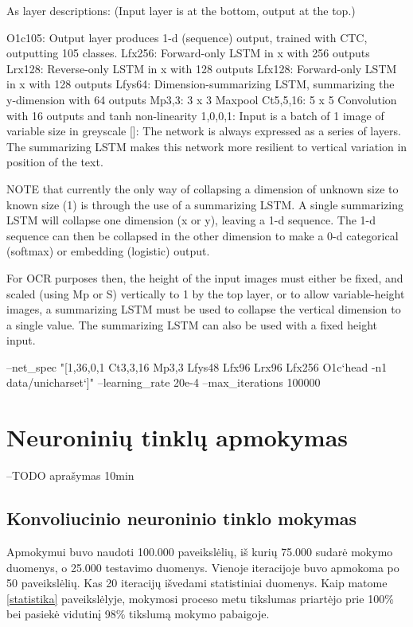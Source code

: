 \documentclass{VUMIFInfBakalaurinis}
\begin{document}
As layer descriptions: (Input layer is at the bottom, output at the top.)

O1c105: Output layer produces 1-d (sequence) output, trained with CTC,
  outputting 105 classes.
Lfx256: Forward-only LSTM in x with 256 outputs
Lrx128: Reverse-only LSTM in x with 128 outputs
Lfx128: Forward-only LSTM in x with 128 outputs
Lfys64: Dimension-summarizing LSTM, summarizing the y-dimension with 64 outputs
Mp3,3: 3 x 3 Maxpool
Ct5,5,16: 5 x 5 Convolution with 16 outputs and tanh non-linearity
1,0,0,1: Input is a batch of 1 image of variable size in greyscale
[]: The network is always expressed as a series of layers.
The summarizing LSTM makes this network more resilient to vertical variation in position of the text.


NOTE that currently the only way of collapsing a dimension of unknown size to known size (1) is through the use of a summarizing LSTM. 
A single summarizing LSTM will collapse one dimension (x or y), leaving a 1-d sequence. The 1-d sequence can then be collapsed in the 
other dimension to make a 0-d categorical (softmax) or embedding (logistic) output.

For OCR purposes then, the height of the input images must either be fixed, and scaled (using Mp or S) vertically to 1 by the top layer, 
or to allow variable-height images, a summarizing LSTM must be used to collapse the vertical dimension to a single value. 
The summarizing LSTM can also be used with a fixed height input.

--net_spec "[1,36,0,1 Ct3,3,16 Mp3,3 Lfys48 Lfx96 Lrx96 Lfx256 O1c`head -n1 data/unicharset`]" 
--learning_rate 20e-4 
--max_iterations 100000

\pagebreak
\section{Neuroninių tinklų apmokymas}
--TODO
aprašymas 10min

\subsection{Konvoliucinio neuroninio tinklo mokymas}
Apmokymui buvo naudoti 100.000 paveikslėlių, iš kurių 75.000 sudarė mokymo duomenys, o 25.000 testavimo duomenys.
Vienoje iteracijoje buvo apmokoma po 50 paveikslėlių. Kas 20 iteracijų išvedami statistiniai duomenys. Kaip matome \ref{statistika} paveikslėlyje,
mokymosi proceso metu tikslumas priartėjo prie 100\% bei pasiekė vidutinį 98\% tikslumą mokymo pabaigoje.
\end{document}
